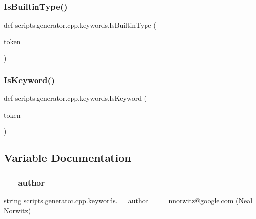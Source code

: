\subsubsection{\texorpdfstring{IsBuiltinType()}{IsBuiltinType()}}
{\footnotesize\ttfamily def scripts.\+generator.\+cpp.\+keywords.\+Is\+Builtin\+Type (\begin{DoxyParamCaption}\item[{}]{token }\end{DoxyParamCaption})}

\mbox{\label{namespacescripts_1_1generator_1_1cpp_1_1keywords_a7f43ad31fd6c84215cb8f90e66fb22f8}} 
\subsubsection{\texorpdfstring{IsKeyword()}{IsKeyword()}}
{\footnotesize\ttfamily def scripts.\+generator.\+cpp.\+keywords.\+Is\+Keyword (\begin{DoxyParamCaption}\item[{}]{token }\end{DoxyParamCaption})}



\subsection{Variable Documentation}
\mbox{\label{namespacescripts_1_1generator_1_1cpp_1_1keywords_ae480add1f8f173332f7b40600fad3494}} 
\subsubsection{\texorpdfstring{\_\_author\_\_}{\_\_author\_\_}}
{\footnotesize\ttfamily string scripts.\+generator.\+cpp.\+keywords.\+\_\+\+\_\+author\+\_\+\+\_\+ = \textquotesingle{}nnorwitz@google.\+com (Neal Norwitz)\textquotesingle{}\hspace{0.3cm}{\ttfamily [private]}}

